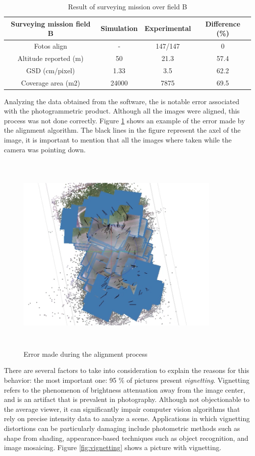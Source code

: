 \begin{table}[H]
\centering
\begin{tabular}{|c|c|c|c|}
\hline
Surveying mission field B & Simulation & Experimental & Difference (\%) \\ \hline
Fotos align               & -          & 147/147      & 0          \\ \hline
Altitude reported (m)     & 50         & 21.3         & 57.4       \\ \hline
GSD (cm/pixel)            & 1.33       & 3.5          & 62.2       \\ \hline
Coverage area (m2)        & 24000      & 7875         & 69.5       \\ \hline
\end{tabular}
\caption{Result of surveying mission over field B}
\label{Table:ResultsB}
\end{table}
Analyzing the data obtained from the software, the is notable error associated with the photogrammetric product. Although all the images were aligned, this process was not done correctly. Figure \ref{fig:error} shows an example of the error made by the alignment algorithm. The black lines in the figure represent the axel of the image, it is important to mention that all the images where taken while the camera was pointing down.
\begin{figure}[H]
\centering
\includegraphics[width=10cm,height=10cm,keepaspectratio]{imagenes/error.png}
\caption{ Error made during the alignment process}
\label{fig:error}
\end{figure}

There are several factors to take into consideration to explain the reasons for this behavior: the most important one: 95 \% of pictures present \textit{vignetting}. Vignetting refers to the phenomenon of brightness attenuation away from the image center, and is an artifact that is prevalent in photography. Although not objectionable to the average viewer, it can significantly impair computer vision algorithms that rely on precise intensity data to analyze a scene. Applications in which vignetting distortions can be particularly damaging include photometric methods such as shape from shading, appearance-based techniques such as object recognition, and image mosaicing.  Figure \ref{fig:vignetting} shows a picture with vignetting.\cite{4663074}

